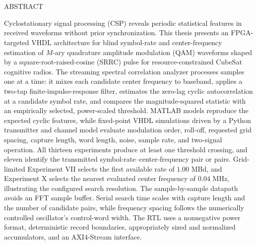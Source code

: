 \clearpage
{}

\begin{center}
  \MakeUppercase{\@title}\\
  \bigskip
  \MakeUppercase{\@author}\\
  \bigskip
  ABSTRACT\\
\end{center}

\bigskip
Cyclostationary signal processing (CSP) reveals periodic statistical features in received waveforms without prior synchronization.  This thesis presents an FPGA-targeted VHDL architecture for blind symbol-rate and center-frequency estimation of $M$-ary quadrature amplitude modulation (QAM) waveforms shaped by a square-root-raised-cosine (SRRC) pulse for resource-constrained CubeSat cognitive radios.  The streaming spectral correlation analyzer processes samples one at a time: it mixes each candidate center frequency to baseband, applies a two-tap finite-impulse-response filter, estimates the zero-lag cyclic autocorrelation at a candidate symbol rate, and compares the magnitude-squared statistic with an empirically selected, power-scaled threshold.  MATLAB models reproduce the expected cyclic features, while fixed-point VHDL simulations driven by a Python transmitter and channel model evaluate modulation order, roll-off, requested grid spacing, capture length, word length, noise, sample rate, and two-signal operation.  All thirteen experiments produce at least one threshold crossing, and eleven identify the transmitted symbol-rate--center-frequency pair or pairs.  Grid-limited Experiment VII selects the first available rate of $1.00$ MBd, and Experiment X selects the nearest evaluated center frequency of $0.04$ MHz, illustrating the configured search resolution.  The sample-by-sample datapath avoids an FFT sample buffer.  Serial search time scales with capture length and the number of candidate pairs, while frequency spacing follows the numerically controlled oscillator's control-word width.  The RTL uses a nonnegative power format, deterministic record boundaries, appropriately sized and normalized accumulators, and an AXI4-Stream interface.
\vfill


